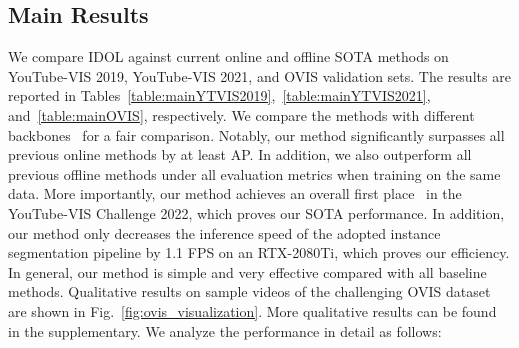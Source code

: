 \documentclass[runningheads]{llncs}
\begin{document}
\subsection{Main Results}
We compare IDOL against current online and offline SOTA methods on YouTube-VIS 2019, YouTube-VIS 2021, and OVIS validation sets. The results are reported in Tables~\ref{table:mainYTVIS2019},~\ref{table:mainYTVIS2021}, and~\ref{table:mainOVIS}, respectively. We compare the methods with different backbones~\cite{resnet,SwinTransformer} for a fair comparison. Notably, our method significantly surpasses all previous online methods by at least  AP. In addition, we also outperform all previous offline methods under all evaluation metrics when training on the same data. 
More importantly, our method achieves an overall first place~\cite{wu1st} in the YouTube-VIS Challenge 2022, which proves our SOTA performance.
In addition, our method only decreases the inference speed of the adopted instance segmentation pipeline by 1.1 FPS on an RTX-2080Ti, which proves our efficiency. In general, our method is simple and very effective compared with all baseline methods.
Qualitative results on sample videos of the challenging OVIS dataset are shown in Fig.~\ref{fig:ovis_visualization}. More qualitative results can be found in the supplementary.
We analyze the performance in detail as follows:
\end{document}
